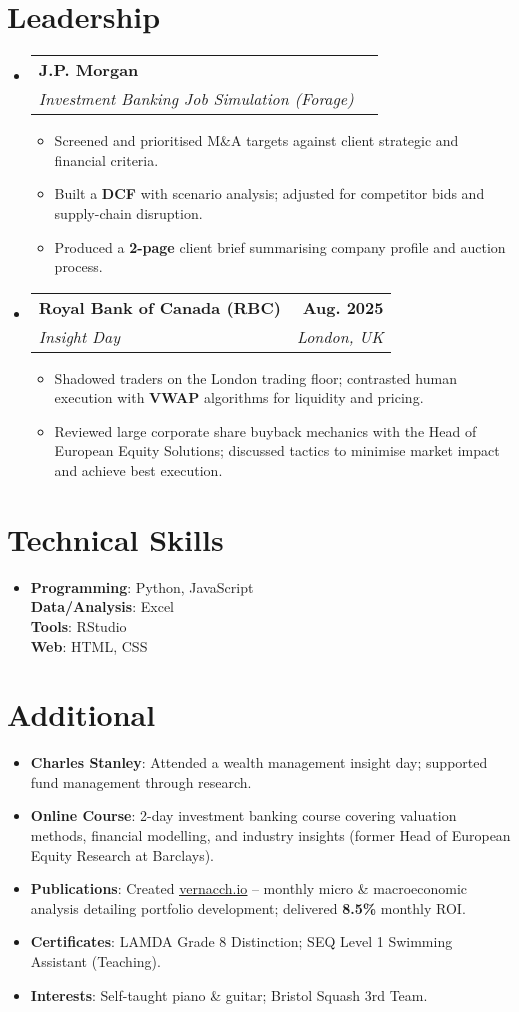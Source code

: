\documentclass[a4paper,11pt]{article}
\makeatletter
\newcommand{\resumeItem}[1]{\item\small{#1 \vspace{-1pt}}}
\newcommand{\resumeSubheading}[4]{
  \vspace{-2pt}\item
  \begin{tabular*}{1.0\textwidth}[t]{l@{\extracolsep{\fill}}r}
    \textbf{#1} & \textbf{\small #2} \\
    \textit{\small #3} & \textit{\small #4} \\
  \end{tabular*}\vspace{-7pt}
}
\newcommand{\resumeSubHeadingListStart}{\begin{itemize}[leftmargin=0.0in, label={}]}
\newcommand{\resumeSubHeadingListEnd}{\end{itemize}}
\newcommand{\resumeItemListStart}{\begin{itemize}[leftmargin=0.15in, itemsep=4pt, topsep=2pt]}
\newcommand{\resumeItemListEnd}{\end{itemize}\vspace{-2pt}}
\makeatother
\begin{document}
\section{Leadership}
  \resumeSubHeadingListStart
    \resumeSubheading
      {J.P. Morgan}{} %
      {Investment Banking Job Simulation (Forage)}{}
      \resumeItemListStart
        \resumeItem{Screened and prioritised M\&A targets against client strategic and financial criteria.}
        \resumeItem{Built a \textbf{DCF} with scenario analysis; adjusted for competitor bids and supply-chain disruption.}
        \resumeItem{Produced a \textbf{2-page} client brief summarising company profile and auction process.}
      \resumeItemListEnd
    \resumeSubheading
      {Royal Bank of Canada (RBC)}{Aug. 2025}
      {Insight Day}{London, UK}
      \resumeItemListStart
        \resumeItem{Shadowed traders on the London trading floor; contrasted human execution with \textbf{VWAP} algorithms for liquidity and pricing.}
        \resumeItem{Reviewed large corporate share buyback mechanics with the Head of European Equity Solutions; discussed tactics to minimise market impact and achieve best execution.}
      \resumeItemListEnd
  \resumeSubHeadingListEnd

\section{Technical Skills}
\begin{itemize}[leftmargin=0.00in, label={}]
  \small\item{
    \textbf{Programming}{: Python, JavaScript} \\
    \textbf{Data/Analysis}{: Excel} \\
    \textbf{Tools}{: RStudio} \\
    \textbf{Web}{: HTML, CSS}
  }
\end{itemize}
\vspace{-10pt}

\section{Additional}
{\small
\begin{itemize}[leftmargin=0.00in,label={},itemsep=4pt,topsep=2pt]
  \item \textbf{Charles Stanley}: Attended a wealth management insight day; supported fund management through research.
  \item \textbf{Online Course}: 2-day investment banking course covering valuation methods, financial modelling, and industry insights (former Head of European Equity Research at Barclays).
  \item \textbf{Publications}: Created \href{https://vernacch.io}{\underline{vernacch.io}} -- monthly micro \& macroeconomic analysis detailing portfolio development; delivered \textbf{8.5\%} monthly ROI.
  \item \textbf{Certificates}: LAMDA Grade 8 Distinction; SEQ Level 1 Swimming Assistant (Teaching).
  \item \textbf{Interests}: Self-taught piano \& guitar; Bristol Squash 3rd Team.
\end{itemize}
}
\end{document}
